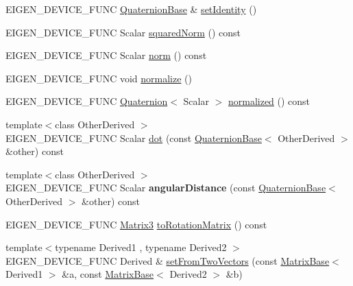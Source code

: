 \begin{DoxyCompactItemize}
\item 
E\+I\+G\+E\+N\+\_\+\+D\+E\+V\+I\+C\+E\+\_\+\+F\+U\+NC \mbox{\hyperlink{class_eigen_1_1_quaternion_base}{Quaternion\+Base}} \& \mbox{\hyperlink{class_eigen_1_1_quaternion_base_a113a5ffea680c7427dc1144d7c66efe9}{set\+Identity}} ()
\item 
E\+I\+G\+E\+N\+\_\+\+D\+E\+V\+I\+C\+E\+\_\+\+F\+U\+NC Scalar \mbox{\hyperlink{class_eigen_1_1_quaternion_base_a5370cf77843374a5adefca3f78770961}{squared\+Norm}} () const
\item 
E\+I\+G\+E\+N\+\_\+\+D\+E\+V\+I\+C\+E\+\_\+\+F\+U\+NC Scalar \mbox{\hyperlink{class_eigen_1_1_quaternion_base_a3c317a676ccae923a9c4a5e80019be17}{norm}} () const
\item 
E\+I\+G\+E\+N\+\_\+\+D\+E\+V\+I\+C\+E\+\_\+\+F\+U\+NC void \mbox{\hyperlink{class_eigen_1_1_quaternion_base_aa8d67d855940925f634327827aed1cad}{normalize}} ()
\item 
E\+I\+G\+E\+N\+\_\+\+D\+E\+V\+I\+C\+E\+\_\+\+F\+U\+NC \mbox{\hyperlink{class_eigen_1_1_quaternion}{Quaternion}}$<$ Scalar $>$ \mbox{\hyperlink{class_eigen_1_1_quaternion_base_af07bcd396dd08136fe4fbbdb182da70f}{normalized}} () const
\item 
{\footnotesize template$<$class Other\+Derived $>$ }\\E\+I\+G\+E\+N\+\_\+\+D\+E\+V\+I\+C\+E\+\_\+\+F\+U\+NC Scalar \mbox{\hyperlink{class_eigen_1_1_quaternion_base_aa95c422b3d12869ed6aa46e4dd5a430a}{dot}} (const \mbox{\hyperlink{class_eigen_1_1_quaternion_base}{Quaternion\+Base}}$<$ Other\+Derived $>$ \&other) const
\item 
\mbox{\label{class_eigen_1_1_quaternion_base_a0261a3b32273d97fe4e3e3cce999c4f8}} 
{\footnotesize template$<$class Other\+Derived $>$ }\\E\+I\+G\+E\+N\+\_\+\+D\+E\+V\+I\+C\+E\+\_\+\+F\+U\+NC Scalar {\bfseries angular\+Distance} (const \mbox{\hyperlink{class_eigen_1_1_quaternion_base}{Quaternion\+Base}}$<$ Other\+Derived $>$ \&other) const
\item 
E\+I\+G\+E\+N\+\_\+\+D\+E\+V\+I\+C\+E\+\_\+\+F\+U\+NC \mbox{\hyperlink{class_eigen_1_1_quaternion_base_ac3972e6cb0f56cccbe9e3946a7e494f8}{Matrix3}} \mbox{\hyperlink{class_eigen_1_1_quaternion_base_a621c71eec9680bf77342b28a473b6874}{to\+Rotation\+Matrix}} () const
\item 
{\footnotesize template$<$typename Derived1 , typename Derived2 $>$ }\\E\+I\+G\+E\+N\+\_\+\+D\+E\+V\+I\+C\+E\+\_\+\+F\+U\+NC Derived \& \mbox{\hyperlink{class_eigen_1_1_quaternion_base_a61ce1b4b1faf6849c9663fd86e9b3a70}{set\+From\+Two\+Vectors}} (const \mbox{\hyperlink{class_eigen_1_1_matrix_base}{Matrix\+Base}}$<$ Derived1 $>$ \&a, const \mbox{\hyperlink{class_eigen_1_1_matrix_base}{Matrix\+Base}}$<$ Derived2 $>$ \&b)

\end{DoxyCompactItemize}
